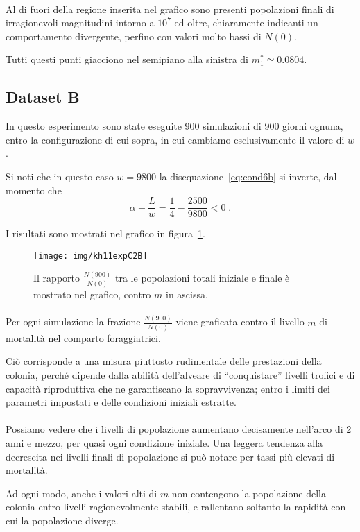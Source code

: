\paragraph{}
Al di fuori della regione inserita nel grafico sono presenti popolazioni finali di irragionevoli
magnitudini intorno a $10^7$ ed oltre, chiaramente indicanti un comportamento divergente, perfino
con valori molto bassi di $N(0)$.

Tutti questi punti giacciono nel semipiano alla sinistra di
$m_1^* \simeq 0.0804$.


\subsection{Dataset B}
In questo esperimento sono state eseguite 900 simulazioni di 900 giorni ognuna, entro la configurazione di
cui sopra, in cui cambiamo esclusivamente il valore di $w$.

Si noti che in questo caso $w=9800$ la disequazione~\eqref{eq:cond6b} si inverte, dal momento che
$$ \alpha - \frac{L}{w} = \frac{1}{4} - \frac{2500}{9800} < 0 \; .$$

I risultati sono mostrati nel grafico in figura~\ref{img:kh11expC2B}.
\begin{figure}[hbt]
    \centering
    \texttt{[image: img/kh11expC2B]}

    \caption[Esperimento C2B]{Il rapporto $\frac{N(900)}{N(0)}$ tra le popolazioni totali iniziale e
    finale è mostrato nel grafico, contro $m$ in ascissa.}

    \label{img:kh11expC2B}
\end{figure}

\paragraph{}
Per ogni simulazione la frazione $\frac{N(900)}{N(0)}$ viene graficata contro il livello $m$ di mortalità
nel comparto foraggiatrici.

Ciò corrisponde a una misura piuttosto rudimentale delle prestazioni della colonia, perché dipende
dalla abilità dell'alveare di ``conquistare'' livelli trofici e di capacità riproduttiva che ne garantiscano
la sopravvivenza; entro i limiti dei parametri impostati e delle condizioni iniziali estratte.

\paragraph{}
Possiamo vedere che i livelli di popolazione aumentano decisamente nell'arco di 2 anni e mezzo, per
quasi ogni condizione iniziale. Una leggera tendenza alla decrescita nei livelli finali di popolazione
si può notare per tassi più elevati di mortalità.

Ad ogni modo, anche i valori alti di $m$ non contengono
la popolazione della colonia entro livelli ragionevolmente stabili, e rallentano soltanto la rapidità
con cui la popolazione diverge.



